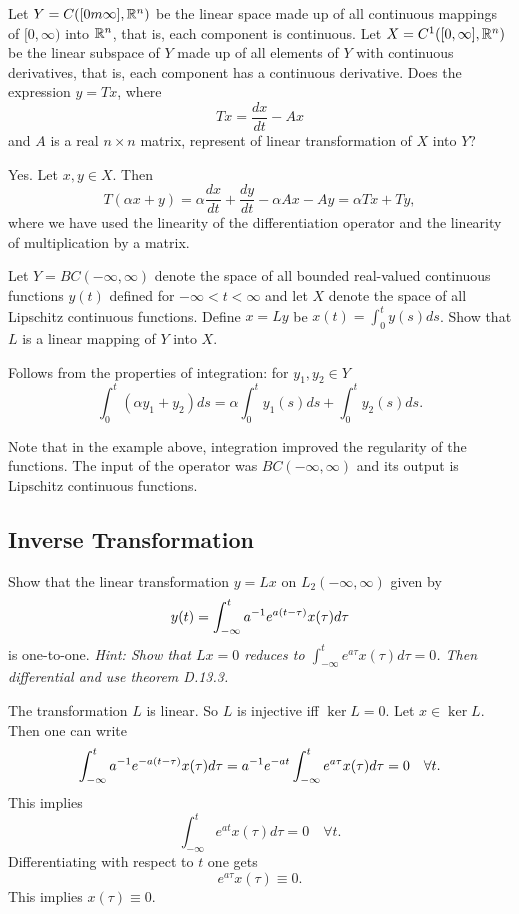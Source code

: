 \begin{problem}
	Let $ Y = C([0m\infty],\mathbb{R}^n) $ be the linear space made up of all continuous mappings of $ [0,\infty) $ into $ \mathbb{R}^n $, that is, each component is continuous. Let $ X = C^1([0,\infty],\mathbb{R}^n) $ be the linear subspace of $ Y $ made up of all elements of $ Y $ with continuous derivatives, that is, each component has a continuous derivative. Does the expression $ y = Tx $, where
	\[ Tx = \frac{dx}{dt} - Ax \]
	and $ A $ is a real $ n\times n $ matrix, represent of linear transformation of $ X $ into $ Y $?
\end{problem}

\begin{solution}
	Yes. Let $ x,y\in X $. Then
	\[ T(\alpha x + y) = \alpha \frac{dx}{dt} + \frac{dy}{dt} - \alpha Ax - Ay=  \alpha Tx + Ty, \]
	where we have used the linearity of the differentiation operator and the linearity of multiplication by a matrix.
\end{solution}

\begin{problem}
	Let $ Y = BC(-\infty,\infty) $ denote the space of all bounded real-valued continuous functions $ y(t) $ defined for $ -\infty < t < \infty $ and let $ X $ denote the space of all Lipschitz continuous functions. Define $ x = Ly $ be $ x(t) = \int_{0}^{t}y(s)ds $. Show that $ L $ is a linear mapping of $ Y $ into $ X $.
\end{problem}
\begin{solution}
	Follows from the properties of integration: for $ y_1,y_2 \in Y $
	\[ \int_{0}^{t}(\alpha y_1+y_2)ds = \alpha \int_{0}^{t}y_1(s)ds + \int_{0}^{t}y_2(s)ds. \]
\end{solution}

\begin{remark}
	Note that in the example above, integration improved the regularity of the functions. The input of the operator was $ BC(-\infty,\infty) $ and its output is Lipschitz continuous functions.
\end{remark}



\subsection{Inverse Transformation}
\begin{problem}
	Show that the linear transformation $ y = Lx $ on $ L_2(-\infty,\infty) $ given by
	\[ y(t) = \int_{-\infty}^{t}a^{-1}e^{a(t-\tau)}x(\tau) d\tau \]
	is one-to-one. \emph{Hint: Show that $ Lx = 0 $ reduces to $ \int_{-\infty}^{t} e^{a\tau}x(\tau)d\tau = 0$. Then differential and use theorem D.13.3.}
\end{problem}
\begin{solution}
	The transformation $ L $ is linear. So $ L $ is injective iff $ \ker L = 0 $. Let $ x\in \ker L $. Then one can write
	\[ \int_{-\infty}^{t}a^{-1}e^{-a(t-\tau)}x(\tau) d\tau = a^{-1} e^{-at} \int_{-\infty}^{t}e^{a\tau}x(\tau) d\tau = 0 \quad \forall t. \]
	This implies
	\[ \int_{-\infty}^{t} e^{at}x(\tau)d\tau = 0 \quad \forall t. \]
	Differentiating with respect to $ t $ one gets
	\[ e^{a\tau}x(\tau) \equiv 0. \]
	This implies $ x(\tau) \equiv 0 $. 
\end{solution}


